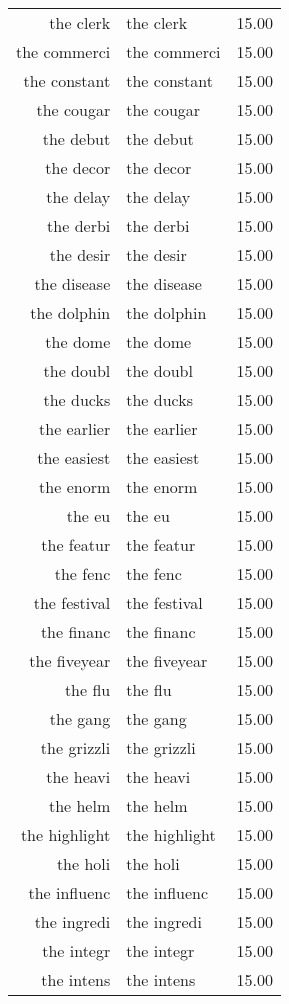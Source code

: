 \begin{table}[ht]
\begin{tabular}{rlr}
  the clerk & the clerk & 15.00 \\ 
  the commerci & the commerci & 15.00 \\ 
  the constant & the constant & 15.00 \\ 
  the cougar & the cougar & 15.00 \\ 
  the debut & the debut & 15.00 \\ 
  the decor & the decor & 15.00 \\ 
  the delay & the delay & 15.00 \\ 
  the derbi & the derbi & 15.00 \\ 
  the desir & the desir & 15.00 \\ 
  the disease & the disease & 15.00 \\ 
  the dolphin & the dolphin & 15.00 \\ 
  the dome & the dome & 15.00 \\ 
  the doubl & the doubl & 15.00 \\ 
  the ducks & the ducks & 15.00 \\ 
  the earlier & the earlier & 15.00 \\ 
  the easiest & the easiest & 15.00 \\ 
  the enorm & the enorm & 15.00 \\ 
  the eu & the eu & 15.00 \\ 
  the featur & the featur & 15.00 \\ 
  the fenc & the fenc & 15.00 \\ 
  the festival & the festival & 15.00 \\ 
  the financ & the financ & 15.00 \\ 
  the fiveyear & the fiveyear & 15.00 \\ 
  the flu & the flu & 15.00 \\ 
  the gang & the gang & 15.00 \\ 
  the grizzli & the grizzli & 15.00 \\ 
  the heavi & the heavi & 15.00 \\ 
  the helm & the helm & 15.00 \\ 
  the highlight & the highlight & 15.00 \\ 
  the holi & the holi & 15.00 \\ 
  the influenc & the influenc & 15.00 \\ 
  the ingredi & the ingredi & 15.00 \\ 
  the integr & the integr & 15.00 \\ 
  the intens & the intens & 15.00 \\ 

\end{tabular}
\end{table}
